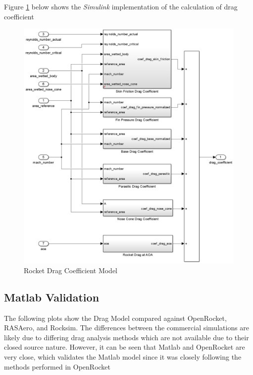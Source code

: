 \documentclass[]{book}
\begin{document}
\clearpage

Figure \ref{rocket_drag_coefficients_label} below shows the
\emph{Simulink} implementation of the calculation of drag coefficient

\begin{figure}[htbp]
\centering
\includegraphics{images/rocket_drag_coefficient.png}
\caption{Rocket Drag Coefficient Model
\label{rocket_drag_coefficients_label}}
\end{figure}

\subsection{Matlab Validation}\label{matlab-validation}

The following plots show the Drag Model compared against OpenRocket,
RASAero, and Rocksim. The differences between the commercial simulations
are likely due to differing drag analysis methods which are not
available due to their closed source nature. However, it can be seen
that Matlab and OpenRocket are very close, which validates the Matlab
model since it was closely following the methods performed in OpenRocket
\end{document}
